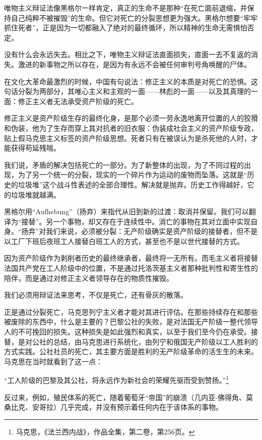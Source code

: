 \documentclass[fontset=fandol, a4paper, 12pt, twoside]{ctexart}
\renewenvironment{quote}
  {\list{}{\rightmargin=0cm \leftmargin=2em}%
   \item\relax\small\kaishu\color{black}}
  {\endlist}
\begin{document}
唯物主义辩证法像黑格尔一样肯定，真正的生命不是那种“在死亡面前退缩，并保持自己纯粹不被摧毁”的生命。但它对死亡的分裂思想更为强大。黑格尔想要“牢牢抓住死者”，正是因为一切都融入了绝对的最终循环，所以精神的生命无需惧怕否定。

没有什么会永远失去。相比之下，唯物主义辩证法直面损失，直面一去不复返的消失。激进的新事物之所以存在，是因为有永远不会被任何审判号角唤醒的尸体。

在文化大革命最激烈的时候，中国有句说法：修正主义的本质是对死亡的恐惧。这句话分裂为两部分，其唯心主义和主观的一面——林彪的一面——以及其真理的一面：修正主义者无法承受资产阶级的死亡。

修正主义是资产阶级生存的最终化身，是那个必须一劳永逸地离开位置的人的狡猾和伪装，他为了生存而穿上其对抗者的旧衣服：伪装成社会主义的资产阶级专政，贴上假马克思主义标签的资产阶级思想。死者只有在被误认为是杀死他的人时，才能获得苟延残喘。

我们说，矛盾的解决包括死亡的一部分。为了新整体的出现，为了不同过程的出现，为了另一个统一的分裂，现实的一个碎片作为运动的废物而坠落。这就是“历史的垃圾堆”这个战斗性表述的全部合理性。解决就是抛弃。历史工作得越好，它的垃圾堆就越满。

黑格尔用“Aufhebung”（扬弃）来指代从旧到新的过渡：取消并保留。我们可以翻译为“接替”。另一个事物，却又存在于连续性中。消亡的事物在其对立面中实现自身。“扬弃”对我们来说，必须被分裂：无产阶级确实是资产阶级的接替者，但不是以工厂下班后夜班工人接替白班工人的方式，甚至也不是以世代接替的方式。

因为资产阶级作为剥削者历史的最终继承者，最终将一无所有。而毛主义者将接替法国共产党在工人阶级中的位置，不是通过托洛茨基主义者那种批判性和寄生性的陪伴，而是通过对修正主义者领导存在的物质性摧毁。

我们必须用辩证法来思考，不仅是死亡，还有骨灰的散落。

正是通过分裂死亡，马克思列宁主义者才能对其进行评估。在那些持续存在和那些被废除的东西中，什么是主要的？巴黎公社的失败，是对法国无产阶级一整代领导人的不可挽回的损失。这种损失是如此强烈和真实，以至于我们至今仍在承受。接替，是对公社的总结，由马克思进行系统化，由列宁和俄国无产阶级以工人胜利的方式实践。公社社员的死亡，其主要方面是胜利的无产阶级革命的活生生的未来。马克思在当时就看到了这一点：

\begin{quote}
“工人阶级的巴黎及其公社，将永远作为新社会的荣耀先驱而受到赞扬。”\footnote{马克思，《法兰西内战》，作品全集，第二卷，第256页。}
\end{quote}

反过来，例如，殖民体系的死亡，随着葡萄牙“帝国”的崩溃（几内亚-佛得角、莫桑比克、安哥拉）几乎完成，并没有预示着任何内在于该体系的事物。
\end{document}
